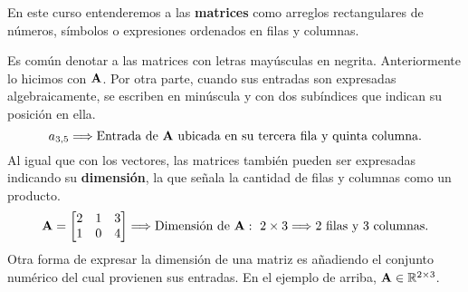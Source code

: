 \documentclass[12pt]{article}
\begin{document}
\begin{figure}[hbt!]
\centering

\end{figure}

En este curso entenderemos a las \textbf{matrices} como arreglos rectangulares de números, símbolos o expresiones ordenados en filas y columnas.

Es común denotar a las matrices con letras mayúsculas en negrita. Anteriormente lo hicimos con $\mathbf{A}$. Por otra parte, cuando sus entradas son expresadas algebraicamente, se escriben en minúscula y con dos subíndices que indican su posición en ella.
\[
  a_{3,5} \Longrightarrow \text{Entrada de } \mathbf{A} \text{ ubicada en su tercera fila y quinta columna.}
\]
Al igual que con los vectores, las matrices también pueden ser expresadas indicando su \textbf{dimensión}, la que señala la cantidad de filas y columnas como un producto.
\[
\mathbf{A} =
\begin{bmatrix}
2 & 1 & 3 \\
1 & 0 & 4
\end{bmatrix}
\Longrightarrow
\text{Dimensión de } \mathbf{A}: \ 2 \times 3
\Longrightarrow
2 \text{ filas y } 3 \text{ columnas.}
\]
Otra forma de expresar la dimensión de una matriz es añadiendo el conjunto numérico del cual provienen sus entradas. En el ejemplo de arriba, $\mathbf{A} \in \mathbb{R}^{2 \times 3}$.
\end{document}
